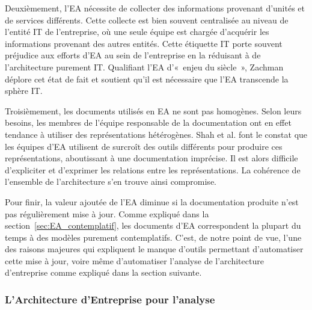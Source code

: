 Deuxièmement, l'EA nécessite de collecter des informations provenant d'unités
et de services différents. Cette collecte est bien souvent centralisée au
niveau de l'entité IT de l'entreprise, où une seule équipe est chargée
d'acquérir les informations provenant des autres entités. Cette étiquette IT
porte souvent préjudice aux efforts d'EA au sein de l'entreprise en la
réduisant à de l'architecture purement IT. Qualifiant l'EA d'«~enjeu du
siècle~», Zachman déplore cet état de fait et soutient qu'il est nécessaire que
l'EA transcende la sphère IT.

Troisièmement, les documents utilisés en EA ne sont pas homogènes. Selon leurs
besoins, les membres de l'équipe responsable de la documentation ont en effet
tendance à utiliser des représentations hétérogènes. Shah et al.
\cite{shah2007frameworks} font le constat que les équipes d'EA utilisent de
surcroît des outils différents pour produire ces représentations, aboutissant à
une documentation imprécise. Il est alors difficile d'expliciter et d'exprimer
les relations entre les représentations. La cohérence de l'ensemble de
l'architecture s'en trouve ainsi compromise.

Pour finir, la valeur ajoutée de l'EA diminue si la documentation produite
n'est pas régulièrement mise à jour. Comme expliqué dans la
section~\ref{sec:EA_contemplatif}, les documents d'EA correspondent la plupart
du temps à des modèles purement contemplatifs. C'est, de notre point de vue,
l'une des raisons majeures qui expliquent le manque d'outils permettant
d'automatiser cette mise à jour, voire même d'automatiser l'analyse de
l'architecture d'entreprise comme expliqué dans la section suivante.

\subsubsection{L'Architecture d'Entreprise pour l'analyse}
\label{sec:EA_analyse_limite}


